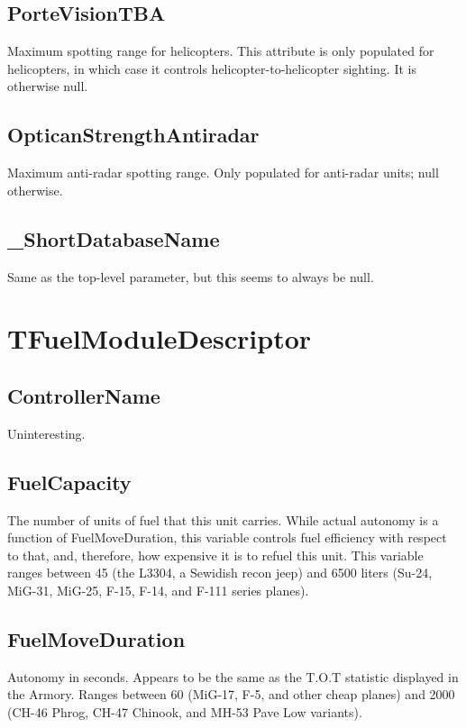 \documentclass{article}
\begin{document}
\subsection{PorteVisionTBA}

Maximum spotting range for helicopters. This attribute is only populated for helicopters, in which case it controls helicopter-to-helicopter sighting. It is otherwise null.

\subsection{OpticanStrengthAntiradar}

Maximum anti-radar spotting range. Only populated for anti-radar units; null otherwise.

\subsection{\_ShortDatabaseName}

Same as the top-level parameter, but this seems to always be null.

\section{TFuelModuleDescriptor}

\subsection{ControllerName}

Uninteresting.

\subsection{FuelCapacity}

The number of units of fuel that this unit carries. While actual autonomy is a function of FuelMoveDuration, this variable controls fuel efficiency with respect to that, and, therefore, how expensive it is to refuel this unit. This variable ranges between 45 (the L3304, a Sewidish recon jeep) and 6500 liters (Su-24, MiG-31, MiG-25, F-15, F-14, and F-111 series planes).

\subsection{FuelMoveDuration}

Autonomy in seconds. Appears to be the same as the T.O.T statistic displayed in the Armory. Ranges between 60 (MiG-17, F-5, and other cheap planes) and 2000 (CH-46 Phrog, CH-47 Chinook, and MH-53 Pave Low variants).
\end{document}
